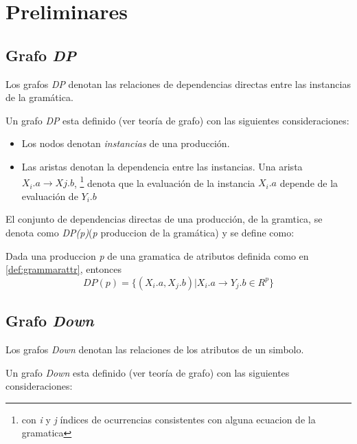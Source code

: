 \section{Preliminares}

\subsection{Grafo \textit{DP}}
Los grafos \textit{DP} denotan las relaciones de dependencias directas entre las instancias de la gramática. 

Un grafo \textit{DP} esta definido (ver teoría de grafo) con las siguientes consideraciones: 

\begin{itemize}
\item Los nodos denotan \textit{instancias} de una producción.
\item Las aristas denotan la dependencia entre las instancias. Una arista $X_{i}.a\rightarrow X{j}.b$, \footnote{con \textit{i} y \textit{j} índices de ocurrencias consistentes con alguna ecuacion de la gramatica} denota que la evaluación de la instancia \textit{$X_{i}.a$} depende de la evaluación de \textit{$Y_{i}.b$} 
\end{itemize}

El conjunto de dependencias directas de una producción, de la gramtica, se denota como \textit{DP(p)}(\textit{p} produccion de la gramática) y se define como:
 \begin{definition}
Dada una produccion \textit{p} de una gramatica de atributos definida como en \ref{def:grammarattr}, entonces
\begin{equation}
 DP(p) = \{(X_{i}.a, X_{j}.b) | X_{i}.a \rightarrow Y_{j}.b \in R^{p} \}
\end{equation}
\end{definition}

\subsection{Grafo \textit{Down}}
Los grafos \textit{Down} denotan las relaciones de los atributos de un simbolo. 

Un grafo \textit{Down} esta definido (ver teoría de grafo) con las siguientes consideraciones: 

